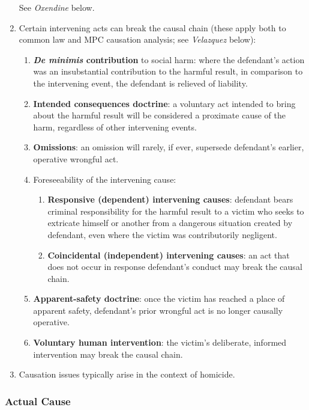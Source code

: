 \begin{enumerate}
    See \emph{Oxendine} below.
    \item Certain intervening acts can break the causal chain (these apply 
    both to common law and MPC causation analysis; see \emph{Velazquez} 
    below):
    \begin{enumerate}
        \item \textbf{\emph{De minimis} contribution} to social harm: where 
        the defendant's action was an insubstantial contribution to the 
        harmful result, in comparison to the intervening event, the defendant 
        is relieved of liability.
        \item \textbf{Intended consequences doctrine}: a voluntary act intended to 
        bring about the harmful result will be considered a proximate cause of 
        the harm, regardless of other intervening events.
        \item \textbf{Omissions}: an omission will rarely, if ever, supersede 
        defendant's earlier, operative wrongful act.
        \item Foreseeability of the intervening cause:
        \begin{enumerate}
            \item \textbf{Responsive (dependent) intervening causes}: 
            defendant bears criminal responsibility for the harmful result to 
            a victim who seeks to extricate himself or another from a 
            dangerous situation created by defendant, even where the victim 
            was contributorily negligent.
            \item \textbf{Coincidental (independent) intervening causes}: an 
            act that does not occur in response defendant's conduct may break 
            the causal chain.
        \end{enumerate}
        \item \textbf{Apparent-safety doctrine}: once the victim has reached a 
        place of apparent safety, defendant's prior wrongful act is no longer 
        causally operative.
        \item \textbf{Voluntary human intervention}: the victim's deliberate, 
        informed intervention may break the causal chain.
    \end{enumerate}
    \item Causation issues typically arise in the context of homicide.
\end{enumerate}

\subsubsection{Actual Cause}

